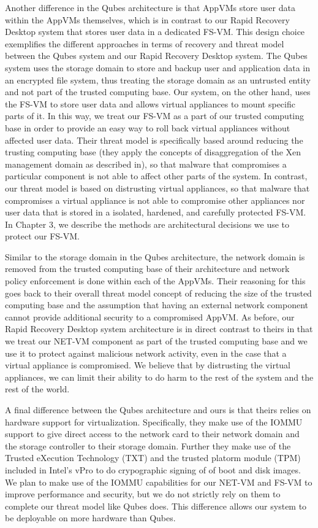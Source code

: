 Another difference in the Qubes architecture is that AppVMs store user data within the AppVMs themselves, which is in contrast to our Rapid Recovery Desktop system that stores user data in a dedicated FS-VM. This design choice exemplifies the different approaches in terms of recovery and threat model between the Qubes system and our Rapid Recovery Desktop system. The Qubes system uses the storage domain to store and backup user and application data in an encrypted file system, thus treating the storage domain as an untrusted entity and not part of the trusted computing base. Our system, on the other hand, uses the FS-VM to store user data and allows virtual appliances to mount specific parts of it. In this way, we treat our FS-VM as a part of our trusted computing base in order to provide an easy way to roll back virtual appliances without affected user data. Their threat model is specifically based around reducing the trusting computing base (they apply the concepts of disaggregation of the Xen management domain as described in\cite{murray_2008}), so that malware that compromises a particular component is not able to affect other parts of the system. In contrast, our threat model is based on distrusting virtual appliances, so that malware that compromises a virtual appliance is not able to compromise other appliances nor user data that is stored in a isolated, hardened, and carefully protected FS-VM. In Chapter 3, we describe the methods are architectural decisions we use to protect our FS-VM.

Similar to the storage domain in the Qubes architecture, the network domain is removed from the trusted computing base of their architecture and network policy enforcement is done within each of the AppVMs. Their reasoning for this goes back to their overall threat model concept of reducing the size of the trusted computing base and the assumption that having an external network component cannot provide additional security to a compromised AppVM. As before, our Rapid Recovery Desktop system architecture is in direct contrast to theirs in that we treat our NET-VM component as part of the trusted computing base and we use it to protect against malicious network activity, even in the case that a virtual appliance is compromised. We believe that by distrusting the virtual appliances, we can limit their ability to do harm to the rest of the system and the rest of the world. 

A final difference between the Qubes architecture and ours is that theirs relies on hardware support for virtualization. Specifically, they make use of the IOMMU support to give direct access to the network card to their network domain and the storage controller to their storage domain. Further they make use of the Trusted eXecution Technology (TXT) and the trusted platorm module (TPM) included in Intel's vPro to do crypographic signing of of boot and disk images. We plan to make use of the IOMMU capabilities for our NET-VM and FS-VM to improve performance and security, but we do not strictly rely on them to complete our threat model like Qubes does. This difference allows our system to be deployable on more hardware than Qubes.

